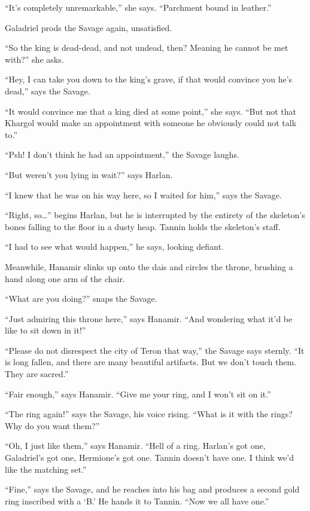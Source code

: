 \documentclass[smalldemyvopaper,11pt,twoside,onecolumn,openright,extrafontsizes]{memoir}
\begin{document}
``It's completely unremarkable,'' she says. ``Parchment bound in
leather.''

Galadriel prods the Savage again, unsatisfied.

``So the king is dead-dead, and not undead, then? Meaning he cannot be
met with?'' she asks.

``Hey, I can take you down to the king's grave, if that would convince
you he's dead,'' says the Savage.

``It would convince me that a king died at some point,'' she says. ``But
not that Khargol would make an appointment with someone he obviously
could not talk to.''

``Psh! I don't think he had an appointment,'' the Savage laughs.

``But weren't you lying in wait?'' says Harlan.

``I knew that he was on his way here, so I waited for him,'' says the
Savage.

``Right, so\ldots{}'' begins Harlan, but he is interrupted by the
entirety of the skeleton's bones falling to the floor in a dusty heap.
Tannin holds the skeleton's staff.

``I had to see what would happen,'' he says, looking defiant.

Meanwhile, Hanamir slinks up onto the dais and circles the throne,
brushing a hand along one arm of the chair.

``What are you doing?'' snaps the Savage.

``Just admiring this throne here,'' says Hanamir. ``And wondering what
it'd be like to sit down in it!''

``Please do not disrespect the city of Teron that way,'' the Savage says
sternly. ``It is long fallen, and there are many beautiful artifacts.
But we don't touch them. They are sacred.''

``Fair enough,'' says Hanamir. ``Give me your ring, and I won't sit on
it.''

``The ring again!'' says the Savage, his voice rising. ``What is it with
the rings? Why do you want them?''

``Oh, I just like them,'' says Hanamir. ``Hell of a ring. Harlan's got
one, Galadriel's got one, Hermione's got one. Tannin doesn't have one. I
think we'd like the matching set.''

``Fine,'' says the Savage, and he reaches into his bag and produces a
second gold ring inscribed with a `B.' He hands it to Tannin. ``Now we
all have one.''
\end{document}
